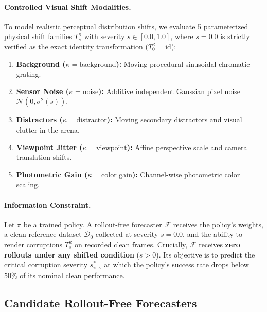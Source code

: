 \paragraph{Controlled Visual Shift Modalities.}
To model realistic perceptual distribution shifts, we evaluate 5 parameterized physical shift families $T_s^\kappa$ with severity $s \in [0.0, 1.0]$, where $s = 0.0$ is strictly verified as the exact identity transformation ($T_0^\kappa = \mathrm{id}$):
\begin{enumerate}
    \item \textbf{Background ($\kappa = \text{background}$):} Moving procedural sinusoidal chromatic grating.
    \item \textbf{Sensor Noise ($\kappa = \text{noise}$):} Additive independent Gaussian pixel noise $\mathcal{N}(0, \sigma^2(s))$.
    \item \textbf{Distractors ($\kappa = \text{distractor}$):} Moving secondary distractors and visual clutter in the arena.
    \item \textbf{Viewpoint Jitter ($\kappa = \text{viewpoint}$):} Affine perspective scale and camera translation shifts.
    \item \textbf{Photometric Gain ($\kappa = \text{color\_gain}$):} Channel-wise photometric color scaling.
\end{enumerate}

\paragraph{Information Constraint.}
Let $\pi$ be a trained policy. A rollout-free forecaster $\mathcal{F}$ receives the policy's weights, a clean reference dataset $\mathcal{D}_0$ collected at severity $s = 0.0$, and the ability to render corruptions $T_s^\kappa$ on recorded clean frames.
Crucially, $\mathcal{F}$ receives \textbf{zero rollouts under any shifted condition} ($s > 0$).
Its objective is to predict the critical corruption severity $s^*_{\pi, \kappa}$ at which the policy's success rate drops below $50\%$ of its nominal clean performance.

\subsection{Candidate Rollout-Free Forecasters}
\label{sec:method:forecasters}

